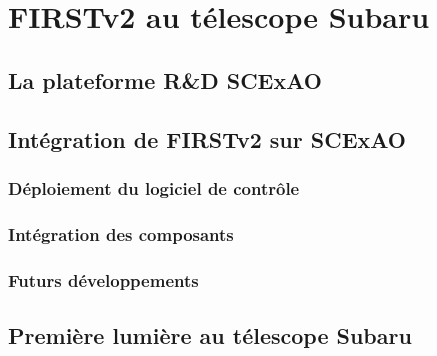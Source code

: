 \clearpage
\section{FIRSTv2 au télescope Subaru}
\label{sec:FIRSTv2Subaru}
\setcounter{figure}{0}
\setcounter{table}{0}

\subsection{La plateforme R\&D SCExAO}

\subsection{Intégration de FIRSTv2 sur SCExAO}

\subsubsection{Déploiement du logiciel de contrôle}

\subsubsection{Intégration des composants}

\subsubsection{Futurs développements}


\subsection{Première lumière au télescope Subaru}

